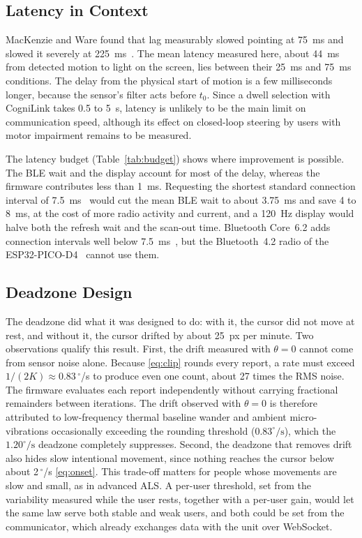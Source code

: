 \documentclass[journal]{IEEEtran}
\newcommand{\dps}{\ensuremath{^{\circ}}/s}
\begin{document}
\subsection{Latency in Context}
MacKenzie and Ware found that lag measurably slowed pointing at 75~ms and slowed it severely at 225~ms~\cite{mackenzie1993}. The mean latency measured here, about 44~ms from detected motion to light on the screen, lies between their 25~ms and 75~ms conditions. The delay from the physical start of motion is a few milliseconds longer, because the sensor's filter acts before $t_0$. Since a dwell selection with CogniLink takes 0.5 to 5~s, latency is unlikely to be the main limit on communication speed, although its effect on closed-loop steering by users with motor impairment remains to be measured.

The latency budget (Table~\ref{tab:budget}) shows where improvement is possible. The BLE wait and the display account for most of the delay, whereas the firmware contributes less than 1~ms. Requesting the shortest standard connection interval of 7.5~ms~\cite{btcore62} would cut the mean BLE wait to about 3.75~ms and save 4 to 8~ms, at the cost of more radio activity and current, and a 120~Hz display would halve both the refresh wait and the scan-out time. Bluetooth Core~6.2 adds connection intervals well below 7.5~ms~\cite{btcore62}, but the Bluetooth~4.2 radio of the ESP32-PICO-D4~\cite{esp32picod4} cannot use them.

\subsection{Deadzone Design}
The deadzone did what it was designed to do: with it, the cursor did not move at rest, and without it, the cursor drifted by about 25~px per minute. Two observations qualify this result. First, the drift measured with $\theta=0$ cannot come from sensor noise alone. Because \eqref{eq:clip} rounds every report, a rate must exceed $1/(2K)\approx0.83$\,\dps{} to produce even one count, about 27 times the RMS noise. The firmware evaluates each report independently without carrying fractional remainders between iterations. The drift observed with $\theta=0$ is therefore attributed to low-frequency thermal baseline wander and ambient micro-vibrations occasionally exceeding the rounding threshold ($0.83^\circ/\text{s}$), which the $1.20^\circ/\text{s}$ deadzone completely suppresses. Second, the deadzone that removes drift also hides slow intentional movement, since nothing reaches the cursor below about 2\,\dps{} \eqref{eq:onset}. This trade-off matters for people whose movements are slow and small, as in advanced ALS. A per-user threshold, set from the variability measured while the user rests, together with a per-user gain, would let the same law serve both stable and weak users, and both could be set from the communicator, which already exchanges data with the unit over WebSocket.
\end{document}
